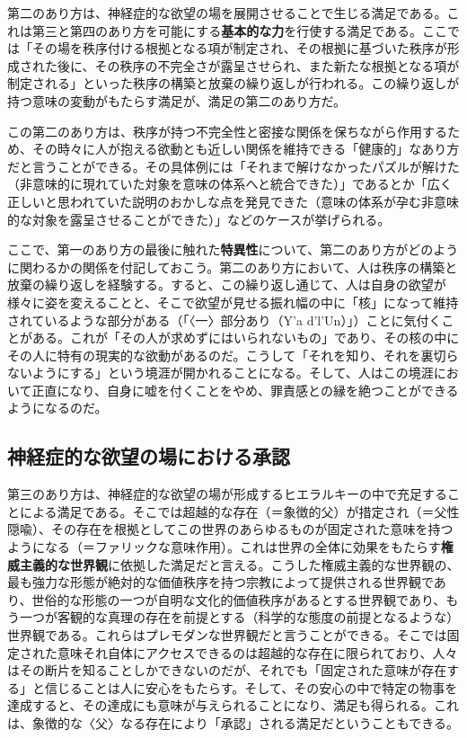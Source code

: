 第二のあり方は、神経症的な欲望の場を展開させることで生じる満足である。これは第三と第四のあり方を可能にする\textbf{基本的な力}を行使する満足である。ここでは「その場を秩序付ける根拠となる項が制定され、その根拠に基づいた秩序が形成された後に、その秩序の不完全さが露呈させられ、また新たな根拠となる項が制定される」といった秩序の構築と放棄の繰り返しが行われる。この繰り返しが持つ意味の変動がもたらす満足が、満足の第二のあり方だ。

この第二のあり方は、秩序が持つ不完全性と密接な関係を保ちながら作用するため、その時々に人が抱える欲動とも近しい関係を維持できる「健康的」なあり方だと言うことができる。その具体例には「それまで解けなかったパズルが解けた（非意味的に現れていた対象を意味の体系へと統合できた）」であるとか「広く正しいと思われていた説明のおかしな点を発見できた（意味の体系が孕む非意味的な対象を露呈させることができた）」などのケースが挙げられる。

ここで、第一のあり方の最後に触れた\textbf{特異性}について、第二のあり方がどのように関わるかの関係を付記しておこう。第二のあり方において、人は秩序の構築と放棄の繰り返しを経験する。すると、この繰り返し通じて、人は自身の欲望が様々に姿を変えることと、そこで欲望が見せる振れ幅の中に「核」になって維持されているような部分がある（「〈一〉部分あり（Y'a
d'l'Un）」）ことに気付くことがある。これが「その人が求めずにはいられないもの」であり、その核の中にその人に特有の現実的な欲動があるのだ。こうして「それを知り、それを裏切らないようにする」という境涯が開かれることになる。そして、人はこの境涯において正直になり、自身に嘘を付くことをやめ、罪責感との縁を絶つことができるようになるのだ。

\subsection{神経症的な欲望の場における承認}\label{ux795eux7d4cux75c7ux7684ux306aux6b32ux671bux306eux5834ux306bux304aux3051ux308bux627fux8a8d}

第三のあり方は、神経症的な欲望の場が形成するヒエラルキーの中で充足することによる満足である。そこでは超越的な存在（＝象徴的父）が措定され（＝父性隠喩）、その存在を根拠としてこの世界のあらゆるものが固定された意味を持つようになる（＝ファリックな意味作用）。これは世界の全体に効果をもたらす\textbf{権威主義的な世界観}に依拠した満足だと言える。こうした権威主義的な世界観の、最も強力な形態が絶対的な価値秩序を持つ宗教によって提供される世界観であり、世俗的な形態の一つが自明な文化的価値秩序があるとする世界観であり、もう一つが客観的な真理の存在を前提とする（科学的な態度の前提となるような）世界観である。これらはプレモダンな世界観だと言うことができる。そこでは固定された意味それ自体にアクセスできるのは超越的な存在に限られており、人々はその断片を知ることしかできないのだが、それでも「固定された意味が存在する」と信じることは人に安心をもたらす。そして、その安心の中で特定の物事を達成すると、その達成にも意味が与えられることになり、満足も得られる。これは、象徴的な〈父〉なる存在により「承認」される満足だということもできる。

